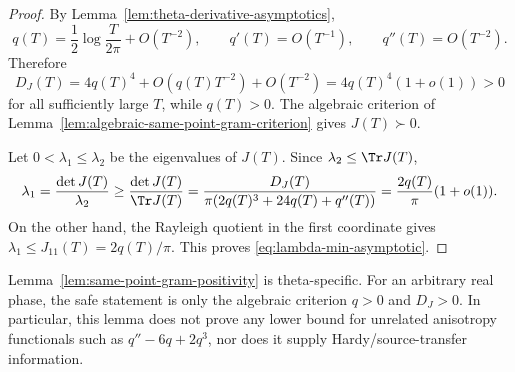 \begin{proof}
By Lemma~\ref{lem:theta-derivative-asymptotics},
\[
q(T)=\frac12\log\frac{T}{2\pi}+O(T^{-2}),\qquad
q'(T)=O(T^{-1}),\qquad q''(T)=O(T^{-2}).
\]
Therefore
\[
D_J(T)=4q(T)^4+O\!\left(q(T)T^{-2}\right)+O(T^{-2})
      =4q(T)^4(1+o(1))>0
\]
for all sufficiently large \(T\), while \(q(T)>0\).  The algebraic criterion
of Lemma~\ref{lem:algebraic-same-point-gram-criterion} gives
\(J(T)\succ0\).

Let \(0<\lambda_1\le\lambda_2\) be the eigenvalues of \(J(T)\).  Since
\(\lambda_2\le\Tr J(T)\),
\[
\lambda_1=\frac{\det J(T)}{\lambda_2}
          \ge \frac{\det J(T)}{\Tr J(T)}
          =\frac{D_J(T)}{\pi(2q(T)^3+24q(T)+q''(T))}
          =\frac{2q(T)}{\pi}(1+o(1)).
\]
On the other hand, the Rayleigh quotient in the first coordinate gives
\(\lambda_1\le J_{11}(T)=2q(T)/\pi\).  This proves
\eqref{eq:lambda-min-asymptotic}.
\end{proof}

\begin{remark}
\label{rem:scope-of-gram-positivity}
Lemma~\ref{lem:same-point-gram-positivity} is theta-specific.  For an arbitrary
real phase, the safe statement is only the algebraic criterion
\(q>0\) and \(D_J>0\).  In particular, this lemma does not prove any lower
bound for unrelated anisotropy functionals such as
\(q''-6q+2q^3\), nor does it supply Hardy/source-transfer information.
\end{remark}
